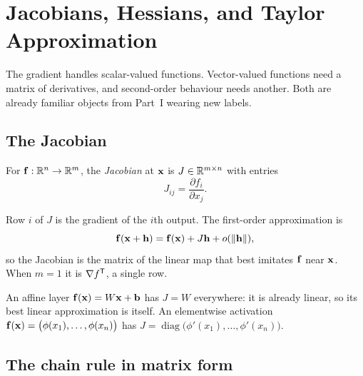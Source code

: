 \setchapterpreamble[u]{\margintoc}
\chapter{Jacobians, Hessians, and Taylor Approximation}


The gradient handles scalar-valued functions. Vector-valued functions need a
matrix of derivatives, and second-order behaviour needs another. Both are
already familiar objects from Part~I wearing new labels.

\section{The Jacobian}

\begin{definition}
For \(\mathbf{f}:\mathbb{R}^{n}\to\mathbb{R}^{m}\), the \emph{Jacobian} at \(\mathbf{x}\) is
\(J\in\mathbb{R}^{m\times n}\) with entries
\[
	J_{ij}=\frac{\partial f_i}{\partial x_j}.
\]
\end{definition}

Row \(i\) of \(J\) is the gradient of the \(i\)th output. The first-order
approximation is
\[
	\mathbf{f}(\mathbf{x}+\mathbf{h})=\mathbf{f}(\mathbf{x})+J\mathbf{h}+o(\lVert\mathbf{h}\rVert),
\]
so the Jacobian is the matrix of the linear map that best imitates \(\mathbf{f}\)
near \(\mathbf{x}\). When \(m=1\) it is \(\nabla f^{\mathsf{T}}\), a single row.


\begin{example}
An affine layer \(\mathbf{f}(\mathbf{x})=W\mathbf{x}+\mathbf{b}\) has \(J=W\)
everywhere: it is already linear, so its best linear approximation is itself. An
elementwise activation \(\mathbf{f}(\mathbf{x})=\bigl(\phi(x_1),\ldots,\phi(x_n)\bigr)\)
has \(J=\operatorname{diag}\bigl(\phi'(x_1),\ldots,\phi'(x_n)\bigr)\).
\end{example}

\section{The chain rule in matrix form}


